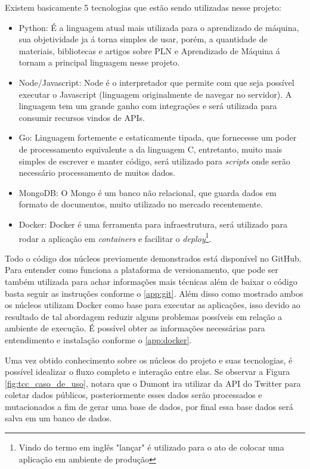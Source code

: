 Existem basicamente 5 tecnologias que estão sendo utilizadas nesse projeto:
\begin{itemize}
 \item Python: É a linguagem atual mais utilizada para o aprendizado de máquina, sua objetividade ja á torna simples de usar, porém, a quantidade de materiais, bibliotecas e artigos sobre PLN e Aprendizado de Máquina á tornam a principal linguagem nesse projeto.
 \item Node/Javascript: Node é o interpretador que permite com que seja possível executar o Javascript (linguagem originalmente de navegar no servidor). A linguagem tem um grande ganho com integrações e será utilizada para consumir recursos vindos de APIs.
 \item Go: Linguagem fortemente e estaticamente tipada, que fornecesse um poder de processamento equivalente a da linguagem C, entretanto, muito mais simples de escrever e manter código, será utilizado para \textit{scripts} onde serão necessário processamento de muitos dados.
 \item MongoDB: O Mongo é um banco não relacional, que guarda dados em formato de documentos, muito utilizado no mercado recentemente.
 \item Docker: Docker é uma ferramenta para infraestrutura, será utilizado para rodar a aplicação em \textit{containers} e facilitar o \textit{deploy}\footnote{Vindo do termo em inglês "lançar" é utilizado para o ato de colocar uma aplicação em ambiente de produção}.
\end{itemize}

Todo o código dos núcleos previamente demonstrados está disponível no GitHub. Para entender como funciona a plataforma de versionamento, que pode ser também utilizada para achar informações mais técnicas além de baixar o código basta seguir as instruções conforme o \autoref{app:git}. Além disso como mostrado ambos os núcleos utilizam Docker como base para executar as aplicações, isso devido ao resultado de tal abordagem reduzir alguns problemas possíveis em relação a ambiente de execução. É possível obter as informações necessárias para entendimento e instalação conforme o \autoref{app:docker}.

Uma vez obtido conhecimento sobre os núcleos do projeto e suas tecnologias, é possível idealizar o fluxo completo e interação entre elas. Se observar a Figura \ref{fig:tcc_caso_de_uso}, notara que o Dumont ira utilizar da API do Twitter para coletar dados públicos, posteriormente esses dados serão processados e mutacionados a fim de gerar uma base de dados, por final essa base dados será salva em um banco de dados.

